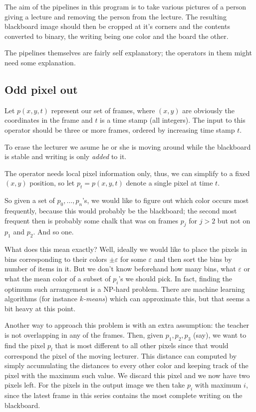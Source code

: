 \documentclass{article}
\begin{document}
The aim of the pipelines in this program is to take various pictures of a
person giving a lecture and removing the person from the lecture. The resulting
blackboard image should then be cropped at it's corners and the contents
converted to binary, the writing being one color and the board the other.

The pipelines themselves are fairly self explanatory; the operators in them
might need some explanation.

\subsection{Odd pixel out}
Let $p(x,y,t)$ represent our set of frames, where $(x,y)$ are obviously the
coordinates in the frame and $t$ is a time stamp (all integers). The input to
this operator should be three or more frames, ordered by increasing time stamp
$t$.

To erase the lecturer we asume he or she is moving around while the blackboard
is stable and writing is only \emph{added} to it.

The operator needs local pixel information only, thus, we can simplify to a
fixed $(x,y)$ position, so let $p_t=p(x,y,t)$ denote a single pixel at time
$t$.

So given a set of $p_0,\ldots,p_n$'s, we would like to figure out which color
occurs most frequently, because this would probably be the blackboard; the
second most frequent then is probably some chalk that was on frames $p_j$ for
$j > 2$ but not on $p_1$ and $p_2$. And so one.

What does this mean exactly? Well, ideally we would like to place the pixels in
bins corresponding to their colors $\pm \varepsilon$ for some $\varepsilon$ and
then sort the bins by number of items in it.
But we don't know beforehand how many bins, what $\varepsilon$ or what the mean
color of a subset of $p_i$'s we should pick. In fact, finding the optimum such
arrangement is a NP-hard problem. There are machine learning algorithms (for
instance \emph{$k$-means}) which can approximate this, but that seems a bit
heavy at this point. 

Another way to approach this problem is with an extra assumption: the teacher
is not overlapping in any of the frames. Then, given $p_1, p_2, p_3$ (say), we
want to find the pixel $p_l$ that is most different to all other pixels since
that would correspond the pixel of the moving lecturer. This distance can
computed by simply accumulating the distances to every other color and keeping
track of the pixel with the maximum such value. We discard this pixel and we
now have two pixels left. For the pixels in the output image we then take $p_i$
with maximum $i$, since the latest frame in this series contains the most
complete writing on the blackboard.
\end{document}
